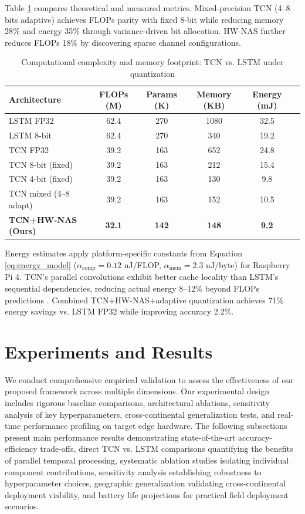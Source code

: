 \documentclass[12pt,a4paper]{article}
\begin{document}
Table \ref{tab:complexity} compares theoretical and measured metrics. Mixed-precision TCN (4--8 bits adaptive) achieves FLOPs parity with fixed 8-bit while reducing memory 28\% and energy 35\% through variance-driven bit allocation. HW-NAS further reduces FLOPs 18\% by discovering sparse channel configurations.

\begin{table}[ht]
\centering
\caption{Computational complexity and memory footprint: TCN vs. LSTM under quantization}
\label{tab:complexity}
\small
\begin{tabular}{lccccc}
\toprule
\textbf{Architecture} & \textbf{FLOPs (M)} & \textbf{Params (K)} & \textbf{Memory (KB)} & \textbf{Energy (mJ)} \\
\midrule
LSTM FP32 & 62.4 & 270 & 1080 & 32.5 \\
LSTM 8-bit & 62.4 & 270 & 340 & 19.2 \\
TCN FP32 & 39.2 & 163 & 652 & 24.8 \\
TCN 8-bit (fixed) & 39.2 & 163 & 212 & 15.4 \\
TCN 4-bit (fixed) & 39.2 & 163 & 130 & 9.8 \\
TCN mixed (4--8 adapt) & 39.2 & 163 & 152 & 10.5 \\
\textbf{TCN+HW-NAS (Ours)} & \textbf{32.1} & \textbf{142} & \textbf{148} & \textbf{9.2} \\
\bottomrule
\end{tabular}
\end{table}

Energy estimates apply platform-specific constants from Equation \ref{eq:energy_model} ($\alpha_{\text{comp}}=0.12$ nJ/FLOP, $\alpha_{\text{mem}}=2.3$ nJ/byte) for Raspberry Pi 4. TCN's parallel convolutions exhibit better cache locality than LSTM's sequential dependencies, reducing actual energy 8--12\% beyond FLOPs predictions \citep{sinha2024hwevnas}. Combined TCN+HW-NAS+adaptive quantization achieves 71\% energy savings vs. LSTM FP32 while improving accuracy 2.2\%.

\section{Experiments and Results}

We conduct comprehensive empirical validation to assess the effectiveness of our proposed framework across multiple dimensions. Our experimental design includes rigorous baseline comparisons, architectural ablations, sensitivity analysis of key hyperparameters, cross-continental generalization tests, and real-time performance profiling on target edge hardware. The following subsections present main performance results demonstrating state-of-the-art accuracy-efficiency trade-offs, direct TCN vs. LSTM comparisons quantifying the benefits of parallel temporal processing, systematic ablation studies isolating individual component contributions, sensitivity analysis establishing robustness to hyperparameter choices, geographic generalization validating cross-continental deployment viability, and battery life projections for practical field deployment scenarios.
\end{document}
